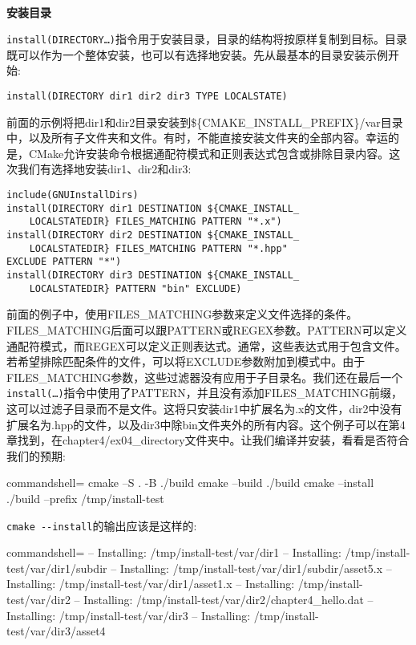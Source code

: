 \hspace*{\fill} \\ %
\noindent
\textbf{安装目录}

\texttt{install(DIRECTORY…)}指令用于安装目录，目录的结构将按原样复制到目标。目录既可以作为一个整体安装，也可以有选择地安装。先从最基本的目录安装示例开始:

\begin{lstlisting}[style=styleCMake]
install(DIRECTORY dir1 dir2 dir3 TYPE LOCALSTATE)
\end{lstlisting}

前面的示例将把dir1和dir2目录安装到\$\{CMAKE\_INSTALL\_PREFIX\}/var目录中，以及所有子文件夹和文件。有时，不能直接安装文件夹的全部内容。幸运的是，CMake允许安装命令根据通配符模式和正则表达式包含或排除目录内容。这次我们有选择地安装dir1、dir2和dir3:

\begin{lstlisting}[style=styleCMake]
include(GNUInstallDirs)
install(DIRECTORY dir1 DESTINATION ${CMAKE_INSTALL_
	LOCALSTATEDIR} FILES_MATCHING PATTERN "*.x")
install(DIRECTORY dir2 DESTINATION ${CMAKE_INSTALL_
	LOCALSTATEDIR} FILES_MATCHING PATTERN "*.hpp"
EXCLUDE PATTERN "*")
install(DIRECTORY dir3 DESTINATION ${CMAKE_INSTALL_
	LOCALSTATEDIR} PATTERN "bin" EXCLUDE)
\end{lstlisting}

前面的例子中，使用FILES\_MATCHING参数来定义文件选择的条件。FILES\_MATCHING后面可以跟PATTERN或REGEX参数。PATTERN可以定义通配符模式，而REGEX可以定义正则表达式。通常，这些表达式用于包含文件。若希望排除匹配条件的文件，可以将EXCLUDE参数附加到模式中。由于FILES\_MATCHING参数，这些过滤器没有应用于子目录名。我们还在最后一个\texttt{install(…)}指令中使用了PATTERN，并且没有添加FILES\_MATCHING前缀，这可以过滤子目录而不是文件。这将只安装dir1中扩展名为.x的文件，dir2中没有扩展名为.hpp的文件，以及dir3中除bin文件夹外的所有内容。这个例子可以在第4章找到，在chapter4/ex04\_directory文件夹中。让我们编译并安装，看看是否符合我们的预期:

\begin{tcblisting}{commandshell={}}
cmake –S . -B ./build
cmake –build ./build
cmake –install ./build –prefix /tmp/install-test
\end{tcblisting}

\texttt{cmake -{}-install}的输出应该是这样的:

\begin{tcblisting}{commandshell={}}
-- Installing: /tmp/install-test/var/dir1
-- Installing: /tmp/install-test/var/dir1/subdir
-- Installing: /tmp/install-test/var/dir1/subdir/asset5.x
-- Installing: /tmp/install-test/var/dir1/asset1.x
-- Installing: /tmp/install-test/var/dir2
-- Installing: /tmp/install-test/var/dir2/chapter4_hello.dat
-- Installing: /tmp/install-test/var/dir3
-- Installing: /tmp/install-test/var/dir3/asset4
\end{tcblisting}

